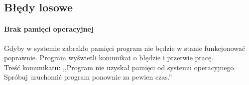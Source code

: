 \documentclass{report}
\begin{document}
\subsection{Błędy losowe}
\paragraph{Brak pamięci operacyjnej}
Gdyby w systemie zabrakło pamięci program nie będzie w stanie funkcjonować poprawnie. Program wyświetli komunikat o błędzie i przerwie pracę. \\
Treść komunikatu: ,,Program nie uzyskał pamięci od systemu operacyjnego. Spróbuj uruchomić program ponownie za pewien czas.''
\end{document}
